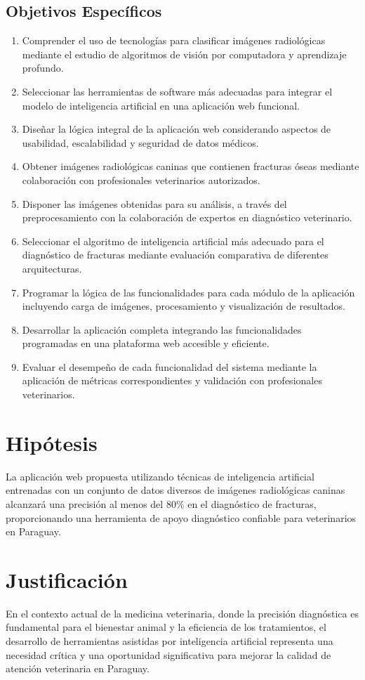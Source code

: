 \subsection{Objetivos Específicos}
\begin{enumerate}
\item Comprender el uso de tecnologías para clasificar imágenes radiológicas mediante el estudio de algoritmos de visión por computadora y aprendizaje profundo.
\item Seleccionar las herramientas de software más adecuadas para integrar el modelo de inteligencia artificial en una aplicación web funcional.
\item Diseñar la lógica integral de la aplicación web considerando aspectos de usabilidad, escalabilidad y seguridad de datos médicos.
\item Obtener imágenes radiológicas caninas que contienen fracturas óseas mediante colaboración con profesionales veterinarios autorizados.
\item Disponer las imágenes obtenidas para su análisis, a través del preprocesamiento con la colaboración de expertos en diagnóstico veterinario.
\item Seleccionar el algoritmo de inteligencia artificial más adecuado para el diagnóstico de fracturas mediante evaluación comparativa de diferentes arquitecturas.
\item Programar la lógica de las funcionalidades para cada módulo de la aplicación incluyendo carga de imágenes, procesamiento y visualización de resultados.
\item Desarrollar la aplicación completa integrando las funcionalidades programadas en una plataforma web accesible y eficiente.
\item Evaluar el desempeño de cada funcionalidad del sistema mediante la aplicación de métricas correspondientes y validación con profesionales veterinarios.
\end{enumerate}

\section{Hipótesis}
La aplicación web propuesta utilizando técnicas de inteligencia artificial entrenadas con un conjunto de datos diversos de imágenes radiológicas caninas alcanzará una precisión al menos del 80\% en el diagnóstico de fracturas, proporcionando una herramienta de apoyo diagnóstico confiable para veterinarios en Paraguay.

\section{Justificación}
En el contexto actual de la medicina veterinaria, donde la precisión diagnóstica es fundamental para el bienestar animal y la eficiencia de los tratamientos, el desarrollo de herramientas asistidas por inteligencia artificial representa una necesidad crítica y una oportunidad significativa para mejorar la calidad de atención veterinaria en Paraguay.

